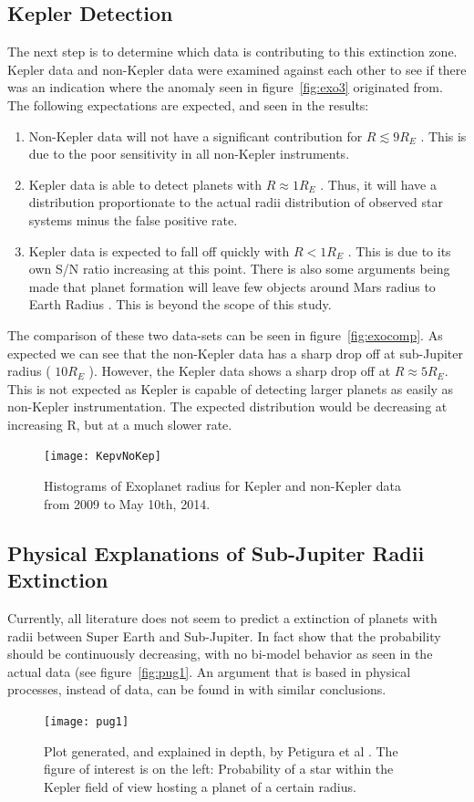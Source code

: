 \documentclass[
10pt, %
a4paper, %
oneside, %
headinclude,footinclude, %
BCOR5mm, %
]{scrartcl}
\begin{document}
\subsection{Kepler Detection}
The next step is to determine which data is contributing to this extinction zone. Kepler data and non-Kepler data were examined against each other to see if there was an indication where the anomaly seen in figure~\vref{fig:exo3} originated from. The following expectations are expected, and seen in the results:
\begin{enumerate}
\item Non-Kepler data will not have a significant contribution for $R\lesssim{}9R_{E}$ . This is due to the poor sensitivity in all non-Kepler instruments. 
\item Kepler data is able to detect planets with $R \approx{} 1R_{E}$ . Thus, it will have a distribution proportionate to the actual radii distribution of observed star systems minus the false positive rate. 
\item Kepler data is expected to fall off quickly with $R < 1R_{E}$ . This is due to its own S/N ratio increasing at this point. There is also some arguments being made that planet formation will leave few objects around Mars radius to Earth Radius \cite{pug,Marcey1}. This is beyond the scope of this study.
\end{enumerate}
The comparison of these two data-sets can be seen in figure~\vref{fig:exocomp}. As expected we can see that the non-Kepler data has a sharp drop off at sub-Jupiter radius ( $10R_{E}$ ). However, the Kepler data shows a sharp drop off at $R\approx{}5R_{E}$. This is not expected as Kepler is capable of detecting larger planets as easily as non-Kepler instrumentation. The expected distribution would be decreasing at increasing R, but at a much slower rate. 
\begin{figure}[tb]
\centering 
\texttt{[image: KepvNoKep]} 
\caption[Kepler v. NonKepler]{Histograms of Exoplanet radius for Kepler and non-Kepler data from 2009 to May 10th, 2014.}
\label{fig:exocomp} 
\end{figure}
\subsection{Physical Explanations of Sub-Jupiter Radii Extinction}
Currently, all literature does not seem to predict a extinction of planets with radii between Super Earth and Sub-Jupiter. In fact \cite{pug} show that the probability should be continuously decreasing, with no bi-model behavior as seen in the actual data (see figure~\vref{fig:pug1}. An argument that is based in physical processes, instead of data, can be found in \cite{ray1} with similar conclusions.
\begin{figure}[tb]
\centering 
\texttt{[image: pug1]} 
\caption[Probability of Star hosting Exoplanet with certain Radius]{Plot generated, and explained in depth, by Petigura et al \cite{pug}. The figure of interest is on the left: Probability of a star within the Kepler field of view hosting a planet of a certain radius.}
\label{fig:pug1} 
\end{figure}
\end{document}
